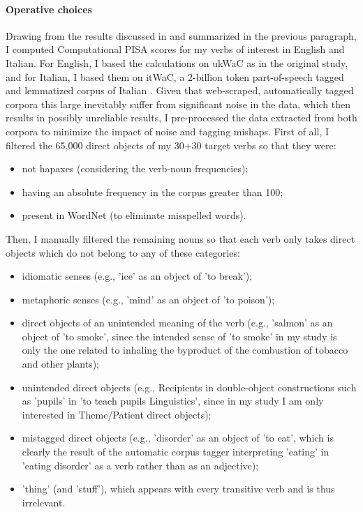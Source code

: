 \paragraph{Operative choices} 
Drawing from the results discussed in \textcite{CappelliLenciPISA} and summarized in the previous paragraph, I computed Computational PISA scores for my verbs of interest in English and Italian. For English, I based the calculations on ukWaC as in the original study, and for Italian, I based them on itWaC, a 2-billion token part-of-speech tagged and lemmatized corpus of Italian \parencite{baroni2009wacky}. Given that web-scraped, automatically tagged corpora this large inevitably suffer from significant noise in the data, which then results in possibly unreliable results, I pre-processed the data extracted from both corpora to minimize the impact of noise and tagging mishaps. First of all, I filtered the 65,000 direct objects of my 30+30 target verbs so that they were:
\begin{itemize}
    \item not hapaxes (considering the verb-noun frequencies);
    \item having an absolute frequency in the corpus greater than 100;
    \item present in WordNet (to eliminate misspelled words).
\end{itemize}
Then, I manually filtered the remaining nouns so that each verb only takes direct objects which do not belong to any of these categories:
\begin{itemize}
    \item idiomatic senses (e.g., 'ice' as an object of 'to break');
    \item metaphoric senses (e.g., 'mind' as an object of 'to poison');
    \item direct objects of an unintended meaning of the verb (e.g., 'salmon' as an object of 'to smoke', since the intended sense of 'to smoke' in my study is only the one related to inhaling the byproduct of the combustion of tobacco and other plants);
    \item unintended direct objects (e.g., Recipients in double-object constructions such as 'pupils' in 'to teach pupils Linguistics', since in my study I am only interested in Theme/Patient direct objects);
    \item mistagged direct objects (e.g., 'disorder' as an object of 'to eat', which is clearly the result of the automatic corpus tagger interpreting 'eating' in 'eating disorder' as a verb rather than as an adjective);
    \item 'thing' (and 'stuff'), which appears with every transitive verb and is thus irrelevant.
\end{itemize}

